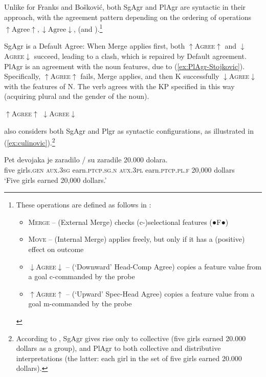 \documentclass[output=paper,colorlinks,citecolor=brown
]{langscibook}
\begin{document}
\noindent Unlike for Franks and Bošković, both SgAgr and PlAgr are syntactic in their approach, with the agreement pattern depending on the ordering of operations \(\uparrow \text{Agree} \uparrow, \downarrow \text{Agree} \downarrow\),  (and ).\footnote{These operations are defined as follows in \citet[1221]{Murphy2018}: \begin{itemize}
    \item[\textbf{a.}] \textsc{Merge} -- (External Merge) checks (c-)selectional features (●F●)
    \item[\textbf{b.}] \textsc{Move} -- (Internal Merge) applies freely, but only if it has a (positive) effect on outcome
    \item[\textbf{c.}] $\downarrow$\textsc{Agree}$\downarrow$ -- (‘Downward’ Head-Comp Agree) copies a feature value from a goal c-commanded by the probe
    \item[\textbf{d.}] $\uparrow$\textsc{Agree}$\uparrow$ -- (‘Upward’ Spec-Head Agree) copies a feature value from a goal m-commanded by the probe
\end{itemize}} 


SgAgr is a Default Agree: When Merge applies first, both $\uparrow$\textsc{Agree}$\uparrow$ and $\downarrow$\textsc{Agree}$\downarrow$ succeed, leading to a clash, which is repaired by Default agreement. PlAgr is an agreement with the noun features, due to (\ref{ex:PlAgr-Stojkovic}). Specifically, $\uparrow$\textsc{Agree}$\uparrow$ fails, Merge applies, and then K successfully $\downarrow$\textsc{Agree}$\downarrow$ with the features of N. The verb agrees with the KP specified in this way (acquiring plural and the gender of the noun).

\ea $\uparrow$\textsc{Agree}$\uparrow$ \gg {} \gg $\downarrow$\textsc{Agree}$\downarrow$ \label{ex:PlAgr-Stojkovic}
\z

\noindent \citet{Culinovic2017} also considers both SgAgr and Plgr as syntactic configurations, as illustrated in (\ref{ex:culinovic}).\footnote{According to \citet{Culinovic2017}, SgAgr gives rise only to collective (five girls earned 20.000 dollars as a group), and PlAgr to both collective and distributive interpretations (the latter: each girl in the set of five girls earned 20.000 dollars).\label{fn:Culinovic}} 

\ea \label{ex:culinovic}
\gll Pet devojaka je zaradilo / su zaradile 20.000 dolara.\\
      five girls.\textsc{gen} \textsc{aux}.3\textsc{sg} earn.\textsc{ptcp.sg.n} {} \textsc{aux}.3\textsc{pl} earn.\textsc{ptcp.pl.f} 20,000 dollars\\
\glt `Five girls earned 20,000 dollars.'
\z
\end{document}
